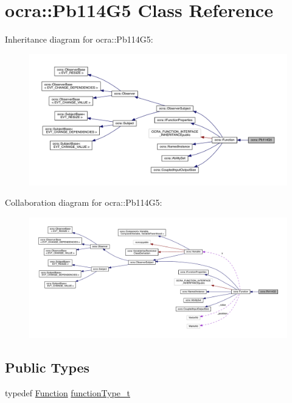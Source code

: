\hypertarget{classocra_1_1Pb114G5}{}\section{ocra\+:\+:Pb114\+G5 Class Reference}
\label{classocra_1_1Pb114G5}


Inheritance diagram for ocra\+:\+:Pb114\+G5\+:\nopagebreak
\begin{figure}[H]
\begin{center}
\leavevmode
\includegraphics[width=350pt]{d1/d2e/classocra_1_1Pb114G5__inherit__graph}
\end{center}
\end{figure}


Collaboration diagram for ocra\+:\+:Pb114\+G5\+:\nopagebreak
\begin{figure}[H]
\begin{center}
\leavevmode
\includegraphics[width=350pt]{d2/d08/classocra_1_1Pb114G5__coll__graph}
\end{center}
\end{figure}
\subsection*{Public Types}
\begin{DoxyCompactItemize}
\item 
typedef \hyperlink{classocra_1_1Function}{Function} \hyperlink{classocra_1_1Pb114G5_af9b5d124dfe6eefc49fe0603b948330e}{function\+Type\+\_\+t}
\end{DoxyCompactItemize}
